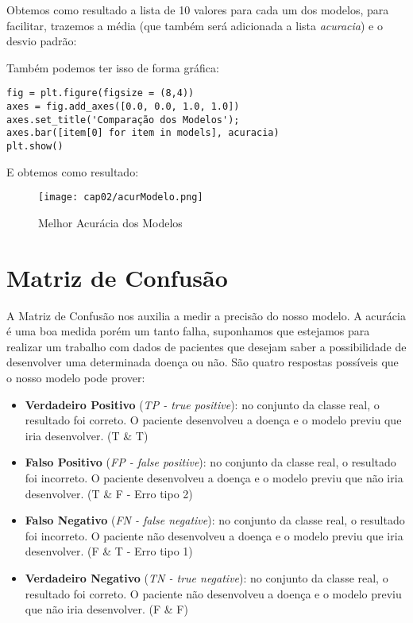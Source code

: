 Obtemos como resultado a lista de 10 valores para cada um dos modelos, para facilitar, trazemos a média (que também será adicionada a lista \textit{acuracia}) e o desvio padrão: \\

Também podemos ter isso de forma gráfica:
\begin{lstlisting}[]
fig = plt.figure(figsize = (8,4))
axes = fig.add_axes([0.0, 0.0, 1.0, 1.0])
axes.set_title('Comparação dos Modelos');
axes.bar([item[0] for item in models], acuracia)
plt.show()
\end{lstlisting}

E obtemos como resultado:
\begin{figure}[H]
	\centering
	\texttt{[image: cap02/acurModelo.png]}
	\caption{Melhor Acurácia dos Modelos}
\end{figure}

\section{Matriz de Confusão}
A Matriz de Confusão nos auxilia a medir a precisão do nosso modelo. A acurácia é uma boa medida porém um tanto falha, suponhamos que estejamos para realizar um trabalho com dados de pacientes que desejam saber a possibilidade de desenvolver uma determinada doença ou não. São quatro respostas possíveis que o nosso modelo pode prover: \vspace{-1em}
\begin{itemize}
	\item \textbf{Verdadeiro Positivo} (\textit{TP - true positive}): no conjunto da classe real, o resultado foi correto. O paciente desenvolveu a doença e o modelo previu que iria desenvolver. (T \& T)
	\item \textbf{Falso Positivo} (\textit{FP - false positive}): no conjunto da classe real, o resultado foi incorreto. O paciente desenvolveu a doença e o modelo previu que não iria desenvolver. (T \& F - Erro tipo 2)
	\item \textbf{Falso Negativo} (\textit{FN - false negative}): no conjunto da classe real, o resultado foi incorreto. O paciente não desenvolveu a doença e o modelo previu que iria desenvolver. (F \& T - Erro tipo 1)
	\item \textbf{Verdadeiro Negativo} (\textit{TN - true negative}): no conjunto da classe real, o resultado foi correto. O paciente não desenvolveu a doença e o modelo previu que não iria desenvolver. (F \& F)
\end{itemize}

